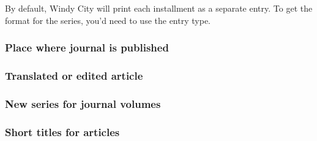 \documentclass[11pt,letterpaper,oneside]{article}
\begin{document}
By default, Windy City will print each installment as a separate
entry. To get the format for the series, you'd need to use the
 entry type.

\begin{citebib}
\item \cite[312]{brown1978}
\end{citebib}

\setcounter{subsubsection}{181}
\subsubsection{Place where journal is published}

\begin{citebib}
\item \cite[65--70]{luu1999}
\item \cite{garrett1975}
\end{citebib}

\subsubsection{Translated or edited article}

\begin{citebib}
\item \cite{authorb}
\item \cite{authorc}
\end{citebib}

\subsubsection{New series for journal volumes}
\label{14.184}

\begin{citebib}
\item \cite[414]{sewall1896}
\item \cite{moraes1950}
\end{citebib}

\subsubsection{Short titles for articles}

\begin{citebib}
\item \cite[223]{rosenblum2015}
\item \cite[225]{rosenblum2015}
\end{citebib}
\end{document}
